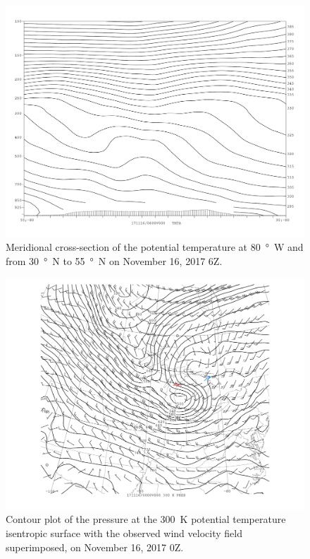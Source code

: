 \documentclass[11pt]{article}
\begin{document}
\begin{figure}[h!]
  \centering
  \includegraphics[width=\textwidth]{thta_171116_6Z_NS}
  \caption{Meridional cross-section of the potential temperature at \SI{80}{\degree W} and from \SI{30}{\degree N} to \SI{55}{\degree N} on November 16, 2017 6Z.}
  \label{fig:thta_171116_6Z_NS}
\end{figure}

\begin{figure}[h!]
  \centering
  \includegraphics[width=\textwidth,trim={2.5cm 1cm 2.5cm 0},clip]{thta_pres_field_MI_0Z}
  \caption{Contour plot of the pressure at the \SI{300}{\K} potential temperature isentropic surface with the observed wind velocity field superimposed, on November 16, 2017 0Z.}
  \label{fig:thta_pres_field_MI_0Z}
\end{figure}
\end{document}
